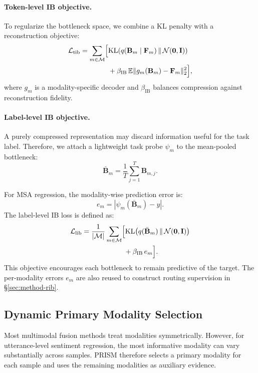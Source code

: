 \documentclass[11pt]{article}
\begin{document}
\paragraph{Token-level IB objective.}
To regularize the bottleneck space, we combine a KL penalty with a
reconstruction objective:
\begin{align}
\mathcal{L}_{\mathrm{tib}}
= \sum_{m\in\mathcal{M}} \Bigl[
&\mathrm{KL}\!\left(
q(\mathbf{B}_m\mid\mathbf{F}_m)
\,\|\,\mathcal{N}(\mathbf{0},\mathbf{I})
\right)
\nonumber\\
&+
\beta_{\mathrm{IB}}\,
\mathbb{E}
\|g_m(\mathbf{B}_m)-\mathbf{F}_m\|_2^2
\Bigr],
\end{align}
where $g_m$ is a modality-specific decoder and $\beta_{\mathrm{IB}}$ balances
compression against reconstruction fidelity.

\paragraph{Label-level IB objective.}
A purely compressed representation may discard information useful for the
task label. Therefore, we attach a lightweight task probe $\psi_m$ to the
mean-pooled bottleneck:
\begin{equation}
\bar{\mathbf{B}}_m =
\frac{1}{T}\sum_{j=1}^{T}\mathbf{B}_{m,j}.
\end{equation}

For MSA regression, the modality-wise prediction error is:
\begin{equation}
e_m = |\psi_m(\bar{\mathbf{B}}_m)-y|.
\end{equation}
The label-level IB loss is defined as:
\begin{align}
\mathcal{L}_{\mathrm{lib}}
&=
\frac{1}{|\mathcal{M}|}
\sum_{m\in\mathcal{M}}
\Bigl[
\mathrm{KL}\!\left(
q(\bar{\mathbf{B}}_m)
\,\|\,\mathcal{N}(\mathbf{0},\mathbf{I})
\right)
\nonumber\\
&\qquad\qquad\qquad
+
\beta_{\mathrm{IB}}\, e_m
\Bigr].
\end{align}
This objective encourages each bottleneck to remain predictive of the target.
The per-modality errors $e_m$ are also reused to construct routing supervision
in \S\ref{sec:method-rib}.

\subsection{Dynamic Primary Modality Selection}
\label{sec:method-msel}

Most multimodal fusion methods treat modalities symmetrically. However, for
utterance-level sentiment regression, the most informative modality can vary
substantially across samples. PRISM therefore selects a primary modality for
each sample and uses the remaining modalities as auxiliary evidence.
\end{document}
